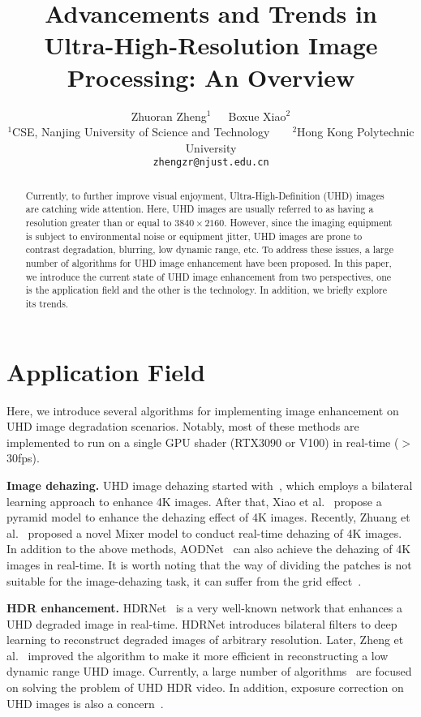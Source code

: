 \documentclass{article}
\title{Advancements and Trends in Ultra-High-Resolution Image Processing: An Overview}
\author{Zhuoran Zheng$^{1}$~~~Boxue Xiao$^{2}$\\
	$^{1}$CSE, Nanjing University of Science and Technology~~~~$^{2}$Hong Kong Polytechnic University\\
	{\tt\small zhengzr@njust.edu.cn}
}
\begin{document}
	
	\maketitle
	
	
\begin{abstract}
%
Currently, to further improve visual enjoyment, Ultra-High-Definition (UHD) images are catching wide attention.
%
Here, UHD images are usually referred to as having a resolution greater than or equal to $3840 \times 2160$.
%
However, since the imaging equipment is subject to environmental noise or equipment jitter, UHD images are prone to contrast degradation, blurring, low dynamic range, etc.
%
To address these issues, a large number of algorithms for UHD image enhancement have been proposed.
%
In this paper, we introduce the current state of UHD image enhancement from two perspectives, one is the application field and the other is the technology.
%
In addition, we briefly explore its trends.
\end{abstract}
	


\section{Application Field}
%
Here, we introduce several algorithms for implementing image enhancement on UHD image degradation scenarios. Notably, most of these methods are implemented to run on a single GPU shader (RTX3090 or V100) in real-time ($>$30fps).
%

\noindent \textbf{Image dehazing.}
%
UHD image dehazing started with~\cite{zheng2021ultra}, which employs a bilateral learning approach to enhance 4K images. After that, Xiao et al.~\cite{xiao2024single} propose a pyramid model to enhance the dehazing effect of 4K images. Recently, Zhuang et al.~\cite{10323236} proposed a novel Mixer model to conduct real-time dehazing of 4K images. In addition to the above methods, AODNet~\cite{li2017all} can also achieve the dehazing of 4K images in real-time. It is worth noting that the way of dividing the patches is not suitable for the image-dehazing task, it can suffer from the grid effect~\cite{zheng2021ultra}.



\noindent \textbf{HDR enhancement.}
%
HDRNet~\cite{gharbi2017deep} is a very well-known network that enhances a UHD degraded image in real-time.
%
HDRNet introduces bilateral filters to deep learning to reconstruct degraded images of arbitrary resolution.
%
Later, Zheng et al.~\cite{zheng2021ultra1} improved the algorithm to make it more efficient in reconstructing a low dynamic range UHD image.
%
Currently, a large number of algorithms~\cite{yao2023bidirectional,zhang2023multi} are focused on solving the problem of UHD HDR video.
%
In addition, exposure correction on UHD images is also a concern~\cite{zhou20234k,wang2021real,liu20234d,zeng2020learning,yang2022adaint,zhang2022dualbln,yang2022seplut,jiang2023meflut,wang2023lgabl}.
\end{document}

